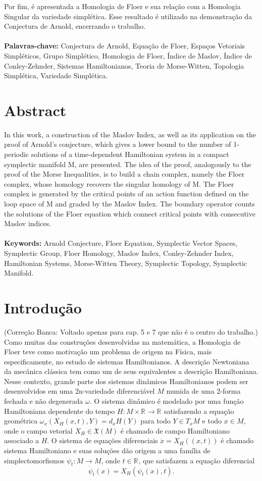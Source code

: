 \documentclass[12pt]{book}
\newcommand{\campohamiltoniano}[1]{X_{H}(#1)}
\newcommand{\campohamiltonianoabrev}{X_{H}}
\newcommand{\campossuaves}[1]{\mathfrak{X}(#1)}
\newcommand{\espacotangenteponto}[2]{T_{#1}#2}
\newcommand{\real}[1]{\mathbb{R}^{#1}}
\newcommand{\reta}{\real{}}
\newcommand{\alerta}[1]{{\color{red}#1}}
\newcommand{\correcaobanca}[1]{\alerta{(Correção Banca: #1)}}
\begin{document}
	Por fim, é apresentada a Homologia de Floer e sua relação com a Homologia Singular da variedade simplética. Esse resultado é utilizado na demonstração da Conjectura de Arnold, encerrando o trabalho.
	\\
	\\	
	\textbf{Palavras-chave:} Conjectura de Arnold, Equação de Floer, Espaços Vetoriais Simpléticos, Grupo Simplético, Homologia de Floer, Índice de Maslov, Índice de Conley-Zehnder, Sistemas Hamiltonianos, Teoria de Morse-Witten, Topologia Simplética, Variedade Simplética.
	
	\chapter*{Abstract}
	In this work, a construction of the Maslov Index, as well as its application on the proof of Arnold's conjecture, which gives a lower bound to the number of 1-periodic solutions of a time-dependent Hamiltonian  system in a compact symplectic manifold M, are presented. The idea of the proof, analogously to the proof of the Morse Inequalities, is to build a chain complex, namely the Floer complex, whose homology recovers the singular homology of M. The Floer complex is generated by the critical points of  an action function defined on the loop space of M and graded by the Maslov Index. The boundary operator counts the solutions of the Floer equation which connect critical points with consecutive Maslov indices.
	\\
	\\
	\textbf{Keywords:}  Arnold Conjecture, Floer Equation, Symplectic Vector Spaces, Symplectic Group, Floer Homology, Maslov Index, Conley-Zehnder Index, Hamiltonian Systems, Morse-Witten Theory, Symplectic Topology, Symplectic  Manifold.
	
	\chapter*{Introdução}\label{capitulo_introducao}
	\correcaobanca{Voltado apenas para cap. 5 e 7 que não é o centro do trabalho.}
	Como muitas das construções desenvolvidas na matemática, a Homologia de Floer teve como motivação um problema de origem na Física, mais especificamente, no estudo de sistemas Hamiltonianos. A descrição Newtoniana da mecânica clássica tem como um de seus equivalentes a descrição Hamiltoniana. Nesse contexto, grande parte dos sistemas dinâmicos Hamiltonianos podem ser desenvolvidos em uma 2n-variedade diferenciável $M$ munida de uma 2-forma fechada e não degenerada $\omega$. O sistema dinâmico é modelado por uma função Hamiltoniana dependente do tempo $H: M\times \reta\to \reta$ satisfazendo a equação geométrica $\omega_{x}(\campohamiltonianoabrev(x,t), Y) = d_{x}H(Y)$ para todo $Y \in \espacotangenteponto{x}{M}$ e todo $x \in M$, onde o campo vetorial $\campohamiltonianoabrev \in \campossuaves{M}$ é chamado de campo Hamiltoniano associado a $H$. O sistema de equações diferenciais $\dot{x} = \campohamiltoniano{(x,t)}$ é chamado sistema Hamiltoniano e suas soluções dão origem a uma família de simplectomorfismos $\psi_{t}:M\to M$, onde $t\in \reta$, que satisfazem a equação diferencial
	$$
	\dot{\psi}_{t}(x) = \campohamiltoniano{\psi_{t}(x),t}.
	$$
	
\end{document}

